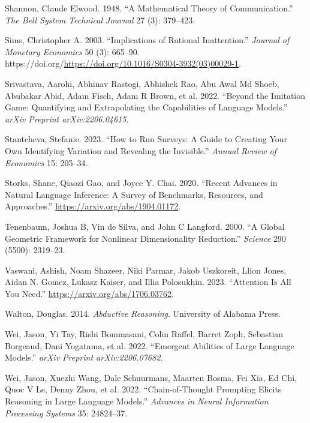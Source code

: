 \documentclass[
]{article}
\newlength{\cslhangindent}
\newenvironment{CSLReferences}[2] %
 {\begin{list}{}{%
  \setlength{\itemindent}{0pt}
  \setlength{\leftmargin}{0pt}
  \setlength{\parsep}{0pt}
  \ifodd #1
   \setlength{\leftmargin}{\cslhangindent}
   \setlength{\itemindent}{-1\cslhangindent}
  \fi
  \setlength{\itemsep}{#2\baselineskip}}}
 {\end{list}}
\begin{document}
\begin{CSLReferences}{1}{0}
Shannon, Claude Elwood. 1948. {``A Mathematical Theory of
Communication.''} \emph{The Bell System Technical Journal} 27 (3):
379--423.

Sims, Christopher A. 2003. {``Implications of Rational Inattention.''}
\emph{Journal of Monetary Economics} 50 (3): 665--90.
https://doi.org/\url{https://doi.org/10.1016/S0304-3932(03)00029-1}.

Srivastava, Aarohi, Abhinav Rastogi, Abhishek Rao, Abu Awal Md Shoeb,
Abubakar Abid, Adam Fisch, Adam R Brown, et al. 2022. {``Beyond the
Imitation Game: Quantifying and Extrapolating the Capabilities of
Language Models.''} \emph{arXiv Preprint arXiv:2206.04615}.

Stantcheva, Stefanie. 2023. {``How to Run Surveys: A Guide to Creating
Your Own Identifying Variation and Revealing the Invisible.''}
\emph{Annual Review of Economics} 15: 205--34.

Storks, Shane, Qiaozi Gao, and Joyce Y. Chai. 2020. {``Recent Advances
in Natural Language Inference: A Survey of Benchmarks, Resources, and
Approaches.''} \url{https://arxiv.org/abs/1904.01172}.

Tenenbaum, Joshua B, Vin de Silva, and John C Langford. 2000. {``A
Global Geometric Framework for Nonlinear Dimensionality Reduction.''}
\emph{Science} 290 (5500): 2319--23.

Vaswani, Ashish, Noam Shazeer, Niki Parmar, Jakob Uszkoreit, Llion
Jones, Aidan N. Gomez, Lukasz Kaiser, and Illia Polosukhin. 2023.
{``Attention Is All You Need.''} \url{https://arxiv.org/abs/1706.03762}.

Walton, Douglas. 2014. \emph{Abductive Reasoning}. University of Alabama
Press.

Wei, Jason, Yi Tay, Rishi Bommasani, Colin Raffel, Barret Zoph,
Sebastian Borgeaud, Dani Yogatama, et al. 2022. {``Emergent Abilities of
Large Language Models.''} \emph{arXiv Preprint arXiv:2206.07682}.

Wei, Jason, Xuezhi Wang, Dale Schuurmans, Maarten Bosma, Fei Xia, Ed
Chi, Quoc V Le, Denny Zhou, et al. 2022. {``Chain-of-Thought Prompting
Elicits Reasoning in Large Language Models.''} \emph{Advances in Neural
Information Processing Systems} 35: 24824--37.


\end{CSLReferences}
\end{document}
